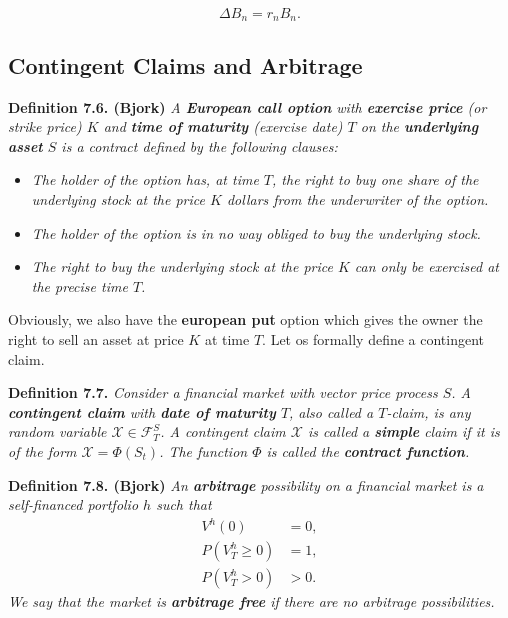 \documentclass[a4paper,12pt,openany]{book}
\providecommand{\tightlist}{%
 \setlength{\itemsep}{0pt}\setlength{\parskip}{0pt}}
\begin{document}
\[
\Delta B_n=r_n B_n.\tag{7.7}
\]

\hypertarget{contingent-claims-and-arbitrage}{%
\subsection{Contingent Claims and Arbitrage}\label{contingent-claims-and-arbitrage}}

\textbf{Definition 7.6. (Bjork)} \emph{A \textbf{European call option} with \textbf{exercise price} (or strike price) \(K\) and \textbf{time of maturity} (exercise date) \(T\) on the \textbf{underlying asset} \(S\) is a contract defined by the following clauses:}

\begin{itemize}
\tightlist
\item
  \emph{The holder of the option has, at time \(T\), the right to buy one share of the underlying stock at the price \(K\) dollars from the underwriter of the option.}
\item
  \emph{The holder of the option is in no way obliged to buy the underlying stock.}
\item
  \emph{The right to buy the underlying stock at the price \(K\) can only be exercised at the precise time \(T\).}
\end{itemize}

Obviously, we also have the \textbf{european put} option which gives the owner the right to sell an asset at price \(K\) at time \(T\). Let os formally define a contingent claim.

\textbf{Definition 7.7.} \emph{Consider a financial market with vector price process \(S\). A \textbf{contingent claim} with \textbf{date of maturity} \(T\), also called a \(T\)-claim, is any random variable \(\mathcal{X}\in\mathcal{F}_T^S\). A contingent claim \(\mathcal{X}\) is called a \textbf{simple} claim if it is of the form \(\mathcal{X} = \Phi(S_t)\). The function \(\Phi\) is called the \textbf{contract function}.}

\textbf{Definition 7.8. (Bjork)} \emph{An \textbf{arbitrage} possibility on a financial market is a self-financed portfolio \(h\) such that}
\begin{align*}
V^h(0)&=0,\tag{7.13}\\
P(V_T^h\ge0)&=1,\tag{7-14}\\
P(V_T^h>0)&>0.\tag{7.15}
\end{align*}
\emph{We say that the market is \textbf{arbitrage free} if there are no arbitrage possibilities.}
\end{document}
